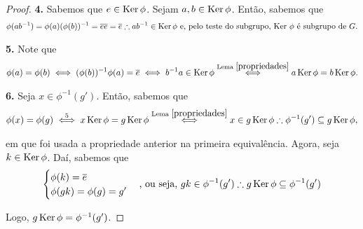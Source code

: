 \begin{proof}
		\par\vspace{0.3cm}\hspace{17pt}\textbf{4.} Sabemos que $e\in \operatorname{Ker}\phi$. Sejam $a,b\in \operatorname{Ker}\phi$. 
		Então, sabemos que 
		\begin{align*}
		    \phi(ab^{-1}) = \phi(a)(\phi(b))^{-1} = \overline{e}\overline{e} 
		                  = \overline{e} \therefore ab^{-1}\in\operatorname{Ker}\phi
		                  \text{ e, pelo teste do subgrupo, Ker $\phi$ é subgrupo de $G$.}
		\end{align*}
		\par\vspace{0.3cm}\hspace{17pt}\textbf{5.} Note que
		\begin{align*}
		    \phi(a) = \phi(b) \iff (\phi(b))^{-1}\phi(a) 
		            = \overline{e} \iff b^{-1}a\in \operatorname{Ker}\phi \overset{\text{Lema }\ref{propriedades}}{\iff} 
		            a\operatorname{Ker}\phi = b\operatorname{Ker}\phi.
		\end{align*}
		\par\vspace{0.3cm}\hspace{17pt}\textbf{6.} Seja $x\in\phi^{-1}(g')$. Então, sabemos que
		\begin{align*}
		    \phi(x) 
		    = \phi(g) \overset{5}{\iff} x\operatorname{Ker}\phi 
		    = g\operatorname{Ker}\phi \overset{\text{Lema }\ref{propriedades}}{\iff}
		    x\in g\operatorname{Ker}\phi \therefore \phi^{-1}(g') \subseteq g\operatorname{Ker}\phi,
		\end{align*}
		\par\vspace{0.3cm} em que foi usada a propriedade anterior na primeira equivalência. 
		Agora, seja $k\in\operatorname{Ker}\phi$. Daí, sabemos que
		\begin{align*}
		    \begin{cases} 
		        \phi(k) = \overline{e} \\ 
		        \phi(gk) = \phi(g) = g'
		    \end{cases} 
		    \text{, ou seja, $gk\in \phi^{-1}(g')$}\therefore g\operatorname{Ker}\phi \subseteq \phi^{-1}(g')
		\end{align*}
		\par\vspace{0.3cm} Logo, $g\operatorname{Ker}\phi = \phi^{-1}(g')$.
	\end{proof}
